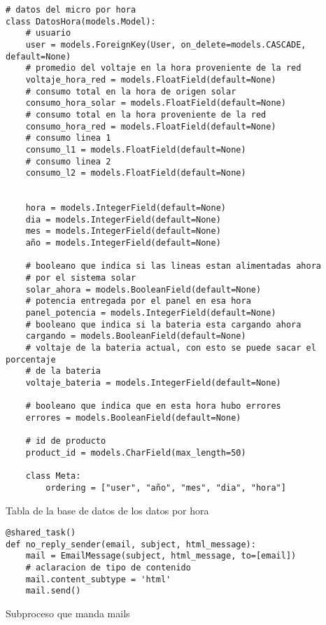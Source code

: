 \begin{listing}[H]
\begin{verbatim}
# datos del micro por hora
class DatosHora(models.Model):
    # usuario
    user = models.ForeignKey(User, on_delete=models.CASCADE, default=None)
    # promedio del voltaje en la hora proveniente de la red
    voltaje_hora_red = models.FloatField(default=None)
    # consumo total en la hora de origen solar
    consumo_hora_solar = models.FloatField(default=None)
    # consumo total en la hora proveniente de la red
    consumo_hora_red = models.FloatField(default=None)
    # consumo linea 1
    consumo_l1 = models.FloatField(default=None)
    # consumo linea 2
    consumo_l2 = models.FloatField(default=None)


    hora = models.IntegerField(default=None)
    dia = models.IntegerField(default=None)
    mes = models.IntegerField(default=None)
    año = models.IntegerField(default=None)

    # booleano que indica si las lineas estan alimentadas ahora 
    # por el sistema solar
    solar_ahora = models.BooleanField(default=None)
    # potencia entregada por el panel en esa hora
    panel_potencia = models.IntegerField(default=None)
    # booleano que indica si la bateria esta cargando ahora
    cargando = models.BooleanField(default=None)
    # voltaje de la bateria actual, con esto se puede sacar el porcentaje 
    # de la bateria
    voltaje_bateria = models.IntegerField(default=None)

    # booleano que indica que en esta hora hubo errores
    errores = models.BooleanField(default=None)

    # id de producto
    product_id = models.CharField(max_length=50)

    class Meta:
        ordering = ["user", "año", "mes", "dia", "hora"]
\end{verbatim}
\caption{Tabla de la base de datos de los datos por hora}
\label{models.py_DatosHora_user_mngmnt}
\end{listing}

\begin{listing}[H]
\begin{verbatim}
@shared_task()
def no_reply_sender(email, subject, html_message):
    mail = EmailMessage(subject, html_message, to=[email])
    # aclaracion de tipo de contenido
    mail.content_subtype = 'html'
    mail.send()
\end{verbatim}
\caption{Subproceso que manda mails}
\label{tasks.py_mails_user_mngmnt}
\end{listing}


